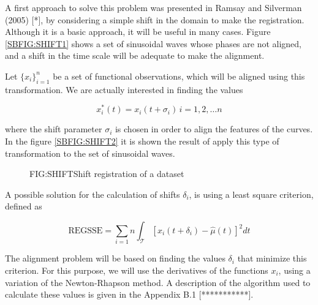 A first approach to solve this problem was presented in Ramsay and Silverman
(2005) [*], by considering a simple shift in the domain to make the
registration. Although it is a basic approach, it will be useful in many cases.
Figure \ref{SBFIG:SHIFT1} shows a set of sinusoidal waves whose phases are not
aligned, and a shift in the time scale will be adequate to make the alignment.

Let $\{x_i\}_{i=1}^n$ be a set of functional observations, which will be aligned
using this transformation. We are actually interested in finding the values

$$
x_i^*(t)=x_i(t+ \sigma_i) \, i=1,2, \dots n
$$

where the shift parameter $\sigma_i$ is chosen in order to align the features of
the curves. In the figure \ref{SBFIG:SHIFT2} it is shown the result of apply
this type of transformation to the set of sinusoidal waves.

\begin{figure}[Shift registration of a dataset]{FIG:SHIFT}{Shift registration of a dataset}
   \quad
\end{figure}

A possible solution for the calculation of shifts $\delta_i$, is using a least
square criterion, defined as

$$
\text{REGSSE} = \sum_{i=1}{n}\int_{\mathcal{T}}\left [x_i(t+\delta_i) - \hat \mu(t) \right ]^2 dt
$$

The alignment problem will be based on finding the values $\delta_i$ that
minimize this criterion. For this purpose, we will use the derivatives of the
functions $x_i$, using a variation of the Newton-Rhapson method. A description
of the algorithm used to calculate these values is given in the Appendix B.1 [***********].
